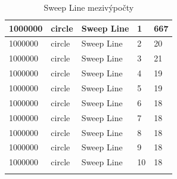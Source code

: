 \documentclass[12pt]{article}
\begin{document}
\begin{longtable}{|l|l|l|l|l|}
1000000      & circle            & Sweep Line & 1          & 667                           \\ \hline
1000000      & circle            & Sweep Line & 2          & 20                            \\ \hline
1000000      & circle            & Sweep Line & 3          & 21                            \\ \hline
1000000      & circle            & Sweep Line & 4          & 19                            \\ \hline
1000000      & circle            & Sweep Line & 5          & 19                            \\ \hline
1000000      & circle            & Sweep Line & 6          & 18                            \\ \hline
1000000      & circle            & Sweep Line & 7          & 18                            \\ \hline
1000000      & circle            & Sweep Line & 8          & 18                            \\ \hline
1000000      & circle            & Sweep Line & 9          & 18                            \\ \hline
1000000      & circle            & Sweep Line & 10         & 18                            \\ \hline
\caption{Sweep Line mezivýpočty}
\end{longtable}
\end{document}
